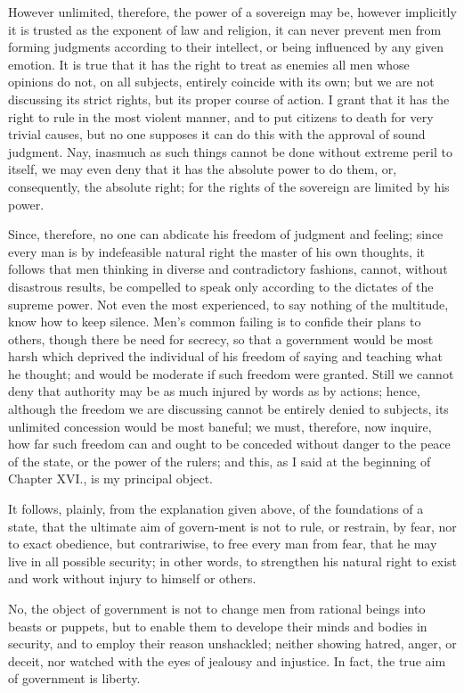 However unlimited, therefore, the power of a sovereign may be, however
implicitly it is trusted as the exponent of law and religion, it can
never prevent men from forming judgments according to their intellect,
or being influenced by any given emotion. It is true that it has the
right to treat as enemies all men whose opinions do not, on all
subjects, entirely coincide with its own; but we are not discussing
its strict rights, but its proper course of action. I grant that it
has the right to rule in the most violent manner, and to put citizens
to death for very trivial causes, but no one supposes it can do this
with the approval of sound judgment. Nay, inasmuch as such things
cannot be done without extreme peril to itself, we may even deny that
it has the absolute power to do them, or, consequently, the absolute
right; for the rights of the sovereign are limited by his power.

Since, therefore, no one can abdicate his freedom of judgment and
feeling; since every man is by indefeasible natural right the master
of his own thoughts, it follows that men thinking in diverse and
contradictory fashions, cannot, without disastrous results, be
compelled to speak only according to the dictates of the supreme
power. Not even the most experienced, to say nothing of the multitude,
know how to keep silence. Men's common failing is to confide their
plans to others, though there be need for secrecy, so that a
government would be most harsh which deprived the individual of his
freedom of saying and teaching what he thought; and would be moderate
if such freedom were granted. Still we cannot deny that authority may
be as much injured by words as by actions; hence, although the freedom
we are discussing cannot be entirely denied to subjects, its unlimited
concession would be most baneful; we must, therefore, now inquire, how
far such freedom can and ought to be conceded without danger to the
peace of the state, or the power of the rulers; and this, as I said at
the beginning of Chapter XVI., is my principal object.

It follows, plainly, from the explanation given above, of the
foundations of a state, that the ultimate aim of govern-ment
is not to rule, or restrain, by fear, nor to exact obedience, but
contrariwise, to free every man from fear, that he may live in all
possible security; in other words, to strengthen his natural right
to exist and work without injury to himself or others.

No, the object of government is not to change men from rational beings
into beasts or puppets, but to enable them to develope their minds and
bodies in security, and to employ their reason unshackled; neither
showing hatred, anger, or deceit, nor watched with the eyes of
jealousy and injustice. In fact, the true aim of government is
liberty.

